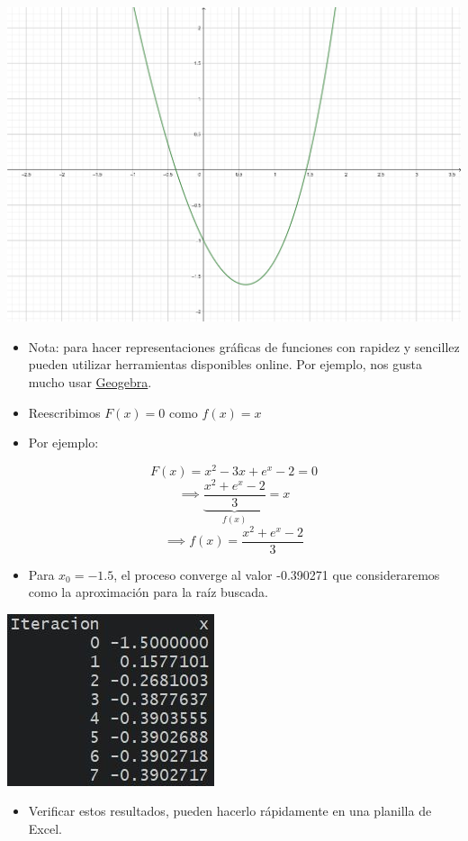 \documentclass[openany]{book}
\providecommand{\tightlist}{%
  \setlength{\itemsep}{0pt}\setlength{\parskip}{0pt}}
\begin{document}
\begin{center}\includegraphics[width=0.7\linewidth]{Plots/U2/f1} \end{center}

\begin{itemize}
\item
  Nota: para hacer representaciones gráficas de funciones con rapidez y sencillez pueden utilizar herramientas disponibles online. Por ejemplo, nos gusta mucho usar \href{https://www.geogebra.org/graphing?lang=en}{Geogebra}.
\item
  Reescribimos \(F(x) = 0\) como \(f(x) = x\)
\item
  Por ejemplo:
\end{itemize}

\[F(x) = x^2-3x+e^x-2 = 0\]
\[\implies \underbrace{\frac{x^2+e^x-2}{3}}_{f(x)} = x \]
\[\implies f(x)= \frac{x^2+e^x-2}{3}\]

\begin{itemize}
\tightlist
\item
  Para \(x_0 = -1.5\), el proceso converge al valor -0.390271 que consideraremos como la aproximación para la raíz buscada.
\end{itemize}

\begin{center}\includegraphics[width=0.4\linewidth]{Plots/U2/rtdo1} \end{center}

\begin{itemize}
\tightlist
\item
  Verificar estos resultados, pueden hacerlo rápidamente en una planilla de Excel.
\end{itemize}
\end{document}
